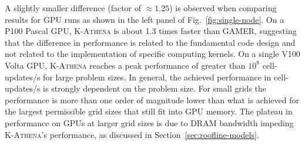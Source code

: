 \documentclass[10pt,journal,compsoc]{IEEEtran}
\newcommand{\textcode}[1]{\textsc{#1}}
\newcommand{\kathena}{\textcode{K-Athena}\xspace}
\newcommand{\gamer}{\textcode{GAMER}\xspace}
\begin{document}
A slightly smaller difference (factor of $\approx1.25$)  is observed when comparing 
results for GPU runs
as shown in the left panel of Fig.~\ref{fig:single-node}.
On a P100 Pascal GPU, \kathena is about 1.3 times faster than \gamer, suggesting
that the difference in performance is related to the fundamental code design and not
related to the implementation of specific computing kernels.
On a single V100 Volta GPU, \kathena reaches a peak performance of
greater than $10^8$ cell-updates/s
for large problem sizes.
In general, the achieved performance in cell-updates/s is strongly dependent on the
problem size.
For small grids the performance is more than one order of magnitude lower than what is
achieved for the largest permissible grid sizes that still fit into GPU memory.
The plateau in performance on GPUs at larger grid sizes is due to DRAM
bandwidth  impeding \kathena's performance, as discussed in
Section~\ref{sec:roofline-models}.
\end{document}
